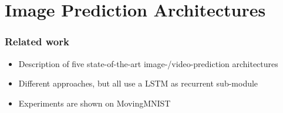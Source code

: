 \section{Image Prediction Architectures} 
 \begin{frame}
  \frametitle{Related work}  
  
  \begin{itemize}
   \item<1-> Description of five state-of-the-art image-/video-prediction architectures
   \item<2-> Different approaches, but all use a LSTM as recurrent sub-module
   \item<3-> Experiments are shown on MovingMNIST \cite{LeCun1998}
  \end{itemize}
 \end{frame}

